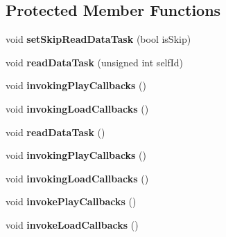 \subsection*{Protected Member Functions}
\begin{DoxyCompactItemize}
\item 
\mbox{\label{classexperimental_1_1AudioCache_a7bb720b2856bb8daa28a1981cb88547e}} 
void {\bfseries set\+Skip\+Read\+Data\+Task} (bool is\+Skip)
\item 
\mbox{\label{classexperimental_1_1AudioCache_a6466ac3a96de316bde17f5d955685e76}} 
void {\bfseries read\+Data\+Task} (unsigned int self\+Id)
\item 
\mbox{\label{classexperimental_1_1AudioCache_a1f57038c3b31d6cdd003e74ae4dae06b}} 
void {\bfseries invoking\+Play\+Callbacks} ()
\item 
\mbox{\label{classexperimental_1_1AudioCache_a5e360d72e164b73a3f58644f4c2b2a6f}} 
void {\bfseries invoking\+Load\+Callbacks} ()
\item 
\mbox{\label{classexperimental_1_1AudioCache_a1c1e43dd3c80cfb7fbc74ef554df4c71}} 
void {\bfseries read\+Data\+Task} ()
\item 
\mbox{\label{classexperimental_1_1AudioCache_a1f57038c3b31d6cdd003e74ae4dae06b}} 
void {\bfseries invoking\+Play\+Callbacks} ()
\item 
\mbox{\label{classexperimental_1_1AudioCache_a5e360d72e164b73a3f58644f4c2b2a6f}} 
void {\bfseries invoking\+Load\+Callbacks} ()
\item 
\mbox{\label{classexperimental_1_1AudioCache_ab285b63d0c5f297a39f867ffc4b80c5a}} 
void {\bfseries invoke\+Play\+Callbacks} ()
\item 
\mbox{\label{classexperimental_1_1AudioCache_a266dad2edce2f390e21b0dfbb261f01e}} 
void {\bfseries invoke\+Load\+Callbacks} ()
\item 

\end{DoxyCompactItemize}

